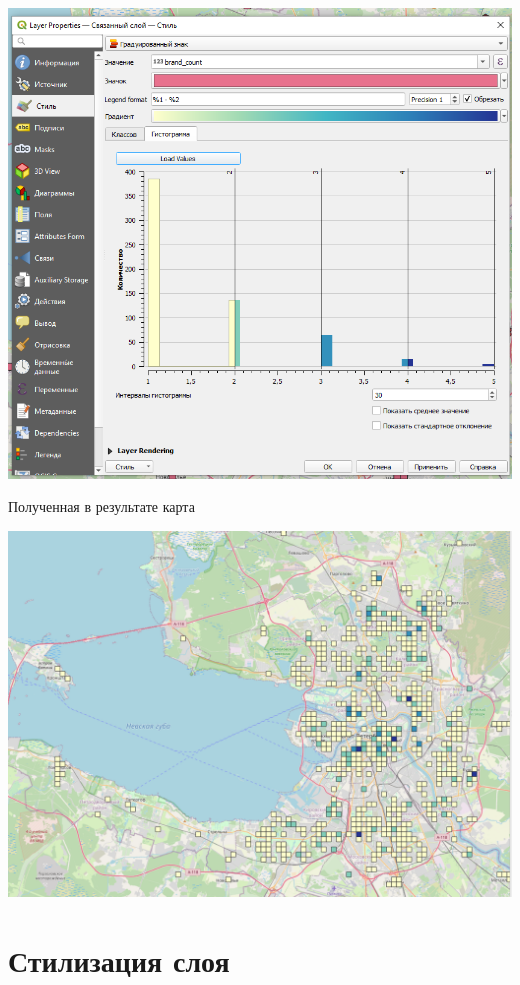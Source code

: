 \documentclass[
]{book}
\begin{document}
\includegraphics{figures/22.png}

Полученная в результате карта

\includegraphics{figures/23.png}

\hypertarget{ux441ux442ux438ux43bux438ux437ux430ux446ux438ux44f-ux441ux43bux43eux44f}{%
\section{Стилизация слоя}\label{ux441ux442ux438ux43bux438ux437ux430ux446ux438ux44f-ux441ux43bux43eux44f}}
\end{document}
